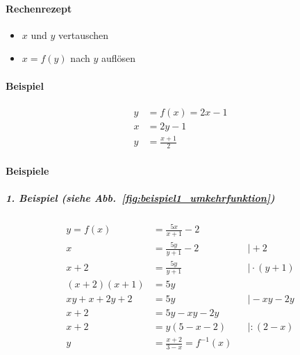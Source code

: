 \paragraph{Rechenrezept}

\begin{itemize}
	\item \(x\) und \(y\) vertauschen
	\item \(x = f(y)\) nach \(y\) auflösen
\end{itemize}

\paragraph{Beispiel}

\begin{align*}
	y & = f(x) = 2x - 1   \\
	x & = 2y - 1          \\
	y & = \frac{x + 1}{2}
\end{align*}

\begin{figure}[H]
	\centering
\end{figure}


\paragraph{Beispiele}

\subparagraph{1. Beispiel (siehe Abb.~\ref{fig:beispiel1_umkehrfunktion})}

\begin{align*}
	y = f(x)        & = \frac{5x}{x+1} -2                                    \\
	x               & = \frac{5y}{y+1} -2           &  & \mid +2             \\
	x+2             & = \frac{5y}{y+1}              &  & \mid  \cdot (y + 1) \\
	(x+2)(x+1)      & = 5y                                                   \\
	xy + x + 2y + 2 & = 5y                          &  & \mid -xy-2y         \\
	x + 2           & = 5y -xy -2y                                           \\
	x + 2           & = y (5-x -2 )                 &  & \mid : (2-x)        \\
	y               & = \frac{x+2}{3-x} = f^{-1}(x)
\end{align*}

